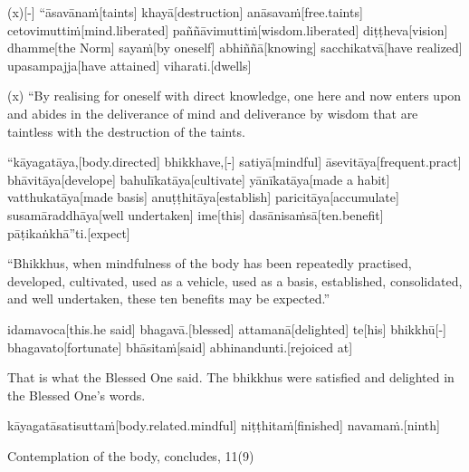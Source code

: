 \begin{samepage}
\begingl[glneveryline={\PaliGlossA,\PaliGlossB}]
(x)[-] “āsavānaṁ[taints] khayā[destruction] anāsavaṁ[free.taints] cetovimuttiṁ[mind.liberated] paññāvimuttiṁ[wisdom.liberated] diṭṭheva[vision] dhamme[the Norm] sayaṁ[by oneself] abhiññā[knowing] sacchikatvā[have realized] upasampajja[have attained] viharati.[dwells]
\endgl
\nopagebreak
\linespread{0.5}
\begin{spacin}{0.2}
{\PaliGlossFT (x) “By realising for oneself with direct knowledge, one here and now enters upon and abides in the deliverance of mind and deliverance by wisdom that are taintless with the destruction of the taints.}
\end{spacin}
\vskip 12pt
\end{samepage}
\begin{samepage}
\begingl[glneveryline={\PaliGlossA,\PaliGlossB}]
“kāyagatāya,[body.directed] bhikkhave,[-] satiyā[mindful] āsevitāya[frequent.pract] bhāvitāya[develope] bahulīkatāya[cultivate] yānīkatāya[made a habit] vatthukatāya[made basis] anuṭṭhitāya[establish] paricitāya[accumulate] susamāraddhāya[well undertaken] ime[this] dasānisaṁsā[ten.benefit] pāṭikaṅkhā”ti.[expect]
\endgl
\nopagebreak
\linespread{0.5}
\begin{spacin}{0.2}
{\PaliGlossFT “Bhikkhus, when mindfulness of the body has been repeatedly practised, developed, cultivated, used as a vehicle, used as a basis, established, consolidated, and well undertaken, these ten benefits may be expected.”}
\end{spacin}
\vskip 12pt
\end{samepage}
\begin{samepage}
\begingl[glneveryline={\PaliGlossA,\PaliGlossB}]
idamavoca[this.he said] bhagavā.[blessed] attamanā[delighted] te[his] bhikkhū[-] bhagavato[fortunate] bhāsitaṁ[said] abhinandunti.[rejoiced at]
\endgl
\nopagebreak
\linespread{0.5}
\begin{spacin}{0.2}
{\PaliGlossFT That is what the Blessed One said. The bhikkhus were satisfied and delighted in the Blessed One’s words.}
\end{spacin}
\vskip 12pt
\end{samepage}
\begin{samepage}
\begingl[glneveryline={\PaliGlossA,\PaliGlossB}]
kāyagatāsatisuttaṁ[body.related.mindful] niṭṭhitaṁ[finished] navamaṁ.[ninth]
\endgl
\nopagebreak
\linespread{0.5}
\begin{spacin}{0.2}
{\PaliGlossFT Contemplation of the body, concludes, 11(9)}
\end{spacin}
\vskip 12pt
\end{samepage}